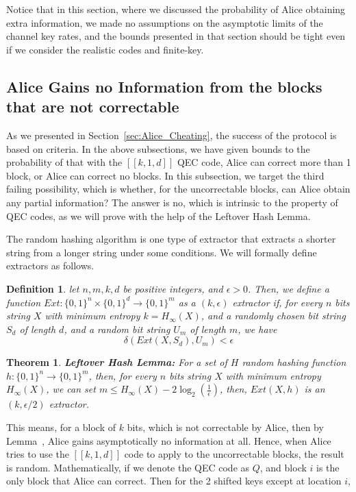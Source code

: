 \documentclass[%
 reprint,
superscriptaddress,
 amsmath,amssymb,
 aps,
]{revtex4-2}
\newtheorem{theorem}{Theorem}[section]
\newtheorem{definition}{Definition}[section]
\begin{document}
Notice that in this section, where we discussed the probability of Alice obtaining extra information, we made no assumptions on the asymptotic limits of the channel key rates, and the bounds presented in that section should be tight even if we consider the realistic codes and finite-key.

\subsection{Alice Gains no Information from the blocks that are not correctable}

As we presented in Section~\ref{sec:Alice_Cheating}, the success of the protocol is based on criteria. In the above subsections, we have given bounds to the probability of that with the $[[k, 1, d]]$ QEC code, Alice can correct more than 1 block, or Alice can correct no blocks. In this subsection, we target the third failing possibility, which is whether, for the uncorrectable blocks, can Alice obtain any partial information? The answer is no, which is intrinsic to the property of QEC codes, as we will prove with the help of the Leftover Hash Lemma.

The random hashing algorithm is one type of extractor that extracts a shorter string from a longer string under some conditions. We will formally define extractors as follows.
\begin{definition}
    let $n, m, k, d$ be positive integers, and $\epsilon > 0$. Then, we define a function $Ext: \{0, 1\}^n\times \{0, 1\}^d \rightarrow \{0, 1\}^m$ as a $(k, \epsilon)$ extractor if, for every $n$ bits string $X$ with minimum entropy $k = H_\infty(X)$, and a randomly chosen bit string $S_d$ of length $d$, and a random bit string $U_m$ of length $m$, we have 
    $$\delta(Ext(X, S_d), U_m)<\epsilon$$
\end{definition}

\begin{theorem}
  \textbf{Leftover Hash Lemma:} For a set of $H$ random hashing function $h: \{0, 1\}^n \rightarrow \{0, 1\}^m$, then, for every $n$ bits string $X$ with minimum entropy $H_\infty(X)$, we can set $m\le H_\infty(X) - 2\log_2\left(\frac{1}{\epsilon}\right)$, then, $Ext(X, h)$ is an $(k, \epsilon/2)$ extractor.
\end{theorem}
This means, for a block of $k$ bits, which is not correctable by Alice, then by Lemma~\cite{Leftover_Hash_lemma}, Alice gains asymptotically no information at all. Hence, when Alice tries to use the $[[k, 1, d]]$ code to apply to the uncorrectable blocks, the result is random. Mathematically, if we denote the QEC code as $Q$, and block $i$ is the only block that Alice can correct. Then for the 2 shifted keys except at location $i$,
\end{document}
